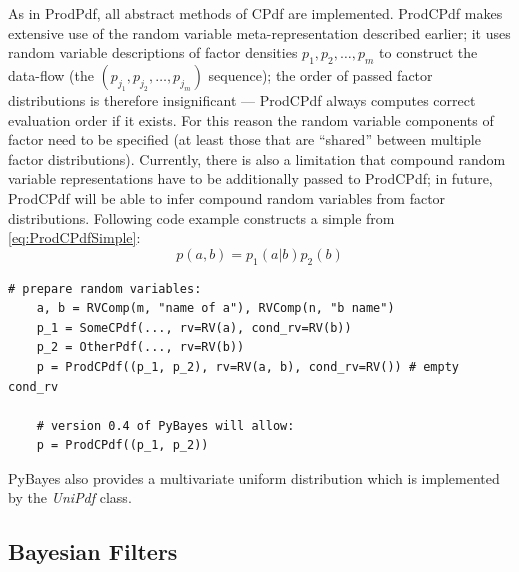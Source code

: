 As in ProdPdf, all abstract methods of CPdf are implemented.
ProdCPdf makes extensive use of the random variable meta-representation described earlier; it uses
random variable descriptions of factor densities \(p_1, p_2, \dotsc, p_m\) to construct the
data-flow (the \((p_{j_1}, p_{j_2}, \dotsc, p_{j_m})\) sequence); the order of passed factor
distributions is therefore insignificant --- ProdCPdf always computes correct evaluation order if
it exists. For this reason the random variable components of factor {\pdfs} need to be specified
(at least those that are ``shared'' between multiple factor distributions). Currently, there is also
a limitation that compound random variable representations have to be additionally passed to ProdCPdf;
in future, ProdCPdf will be able to infer compound random variables from factor distributions.
Following code example constructs a simple {\pdf} from \eqref{eq:ProdCPdfSimple}:
\begin{equation} \label{eq:ProdCPdfSimple}
	p(a,b) = p_1(a|b) p_2(b)
\end{equation}

\begin{Verbatim}[samepage=true,gobble=1,label=ProdCPdf example,frame=single]
	# prepare random variables:
	a, b = RVComp(m, "name of a"), RVComp(n, "b name")
	p_1 = SomeCPdf(..., rv=RV(a), cond_rv=RV(b))
	p_2 = OtherPdf(..., rv=RV(b))
	p = ProdCPdf((p_1, p_2), rv=RV(a, b), cond_rv=RV()) # empty cond_rv

	# version 0.4 of PyBayes will allow:
	p = ProdCPdf((p_1, p_2))
\end{Verbatim}
PyBayes also provides a multivariate uniform distribution which is implemented by the \emph{UniPdf}
class.

\subsection{Bayesian Filters}

